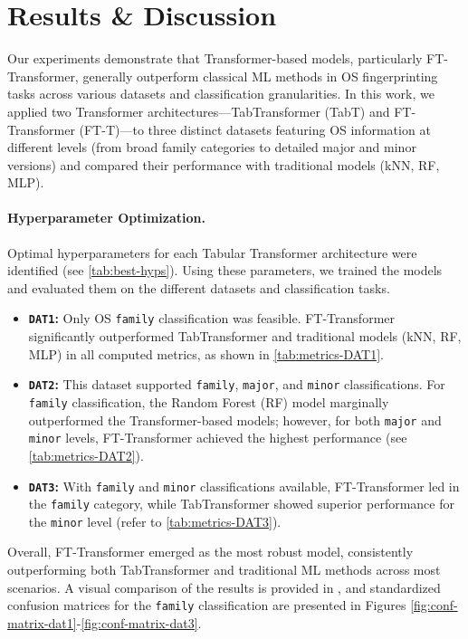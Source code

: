 \section{Results \& Discussion}
\label{sec:results-discussion}

Our experiments demonstrate that Transformer-based models, particularly FT-Transformer, generally outperform classical ML methods in OS fingerprinting tasks across various datasets and classification granularities. In this work, we applied two Transformer architectures—TabTransformer (TabT) and FT-Transformer (FT-T)—to three distinct datasets featuring OS information at different levels (from broad family categories to detailed major and minor versions) and compared their performance with traditional models (kNN, RF, MLP).

\paragraph{Hyperparameter Optimization.} Optimal hyperparameters for each Tabular Transformer architecture were identified (see \autoref{tab:best-hyps}). Using these parameters, we trained the models and evaluated them on the different datasets and classification tasks.

\begin{itemize}
    \item \textbf{\texttt{DAT1}:} Only OS \texttt{family} classification was feasible. FT-Transformer significantly outperformed TabTransformer and traditional models (kNN, RF, MLP) in all computed metrics, as shown in \autoref{tab:metrics-DAT1}.
    
    \item \textbf{\texttt{DAT2}:} This dataset supported \texttt{family}, \texttt{major}, and \texttt{minor} classifications. For \texttt{family} classification, the Random Forest (RF) model marginally outperformed the Transformer-based models; however, for both \texttt{major} and \texttt{minor} levels, FT-Transformer achieved the highest performance (see \autoref{tab:metrics-DAT2}).
    
    \item \textbf{\texttt{DAT3}:} With \texttt{family} and \texttt{minor} classifications available, FT-Transformer led in the \texttt{family} category, while TabTransformer showed superior performance for the \texttt{minor} level (refer to \autoref{tab:metrics-DAT3}).
\end{itemize}

Overall, FT-Transformer emerged as the most robust model, consistently outperforming both TabTransformer and traditional ML methods across most scenarios. A visual comparison of the results is provided in , and standardized confusion matrices for the \texttt{family} classification are presented in Figures \ref{fig:conf-matrix-dat1}-\ref{fig:conf-matrix-dat3}.


